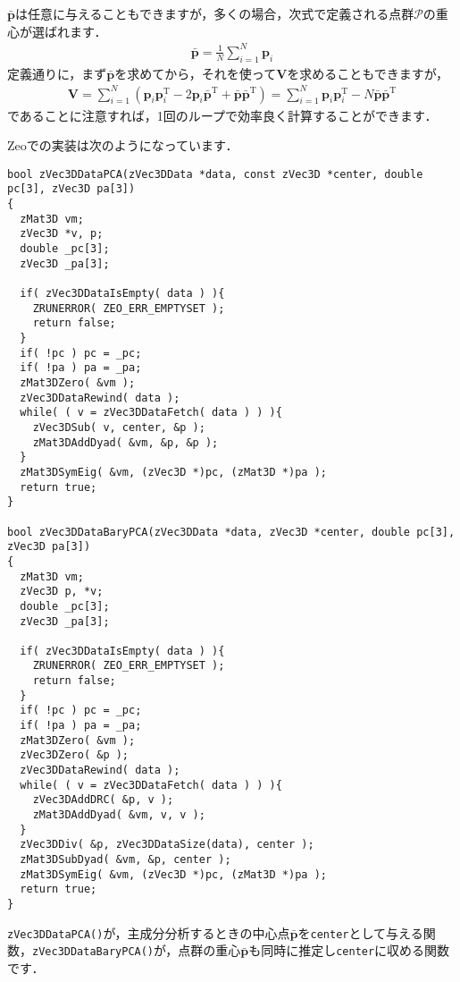 ﻿\documentclass[a4paper]{jsarticle}
\begin{document}
$\bar{\boldsymbol{p}}$は任意に与えることもできますが，多くの場合，次式で定義される点群$\mathcal{P}$の重心が選ばれます．
\begin{align*}
\bar{\boldsymbol{p}}=\frac{1}{N}\sum_{i=1}^{N}\boldsymbol{p}_{i}
\end{align*}
定義通りに，まず$\bar{\boldsymbol{p}}$を求めてから，それを使って$\boldsymbol{V}$を求めることもできますが，
\begin{align*}
\boldsymbol{V}
=\sum_{i=1}^{N}\left(\boldsymbol{p}_{i}\boldsymbol{p}_{i}^{\mathrm{T}}-2\boldsymbol{p}_{i}\bar{\boldsymbol{p}}^{\mathrm{T}}+\bar{\boldsymbol{p}}\bar{\boldsymbol{p}}^{\mathrm{T}}\right)
=\sum_{i=1}^{N}\boldsymbol{p}_{i}\boldsymbol{p}_{i}^{\mathrm{T}}-N\bar{\boldsymbol{p}}\bar{\boldsymbol{p}}^{\mathrm{T}}
\end{align*}
であることに注意すれば，1回のループで効率良く計算することができます．

Zeoでの実装は次のようになっています．
\begin{screen}
\begin{verbatim}
bool zVec3DDataPCA(zVec3DData *data, const zVec3D *center, double pc[3], zVec3D pa[3])
{
  zMat3D vm;
  zVec3D *v, p;
  double _pc[3];
  zVec3D _pa[3];

  if( zVec3DDataIsEmpty( data ) ){
    ZRUNERROR( ZEO_ERR_EMPTYSET );
    return false;
  }
  if( !pc ) pc = _pc;
  if( !pa ) pa = _pa;
  zMat3DZero( &vm );
  zVec3DDataRewind( data );
  while( ( v = zVec3DDataFetch( data ) ) ){
    zVec3DSub( v, center, &p );
    zMat3DAddDyad( &vm, &p, &p );
  }
  zMat3DSymEig( &vm, (zVec3D *)pc, (zMat3D *)pa );
  return true;
}

bool zVec3DDataBaryPCA(zVec3DData *data, zVec3D *center, double pc[3], zVec3D pa[3])
{
  zMat3D vm;
  zVec3D p, *v;
  double _pc[3];
  zVec3D _pa[3];

  if( zVec3DDataIsEmpty( data ) ){
    ZRUNERROR( ZEO_ERR_EMPTYSET );
    return false;
  }
  if( !pc ) pc = _pc;
  if( !pa ) pa = _pa;
  zMat3DZero( &vm );
  zVec3DZero( &p );
  zVec3DDataRewind( data );
  while( ( v = zVec3DDataFetch( data ) ) ){
    zVec3DAddDRC( &p, v );
    zMat3DAddDyad( &vm, v, v );
  }
  zVec3DDiv( &p, zVec3DDataSize(data), center );
  zMat3DSubDyad( &vm, &p, center );
  zMat3DSymEig( &vm, (zVec3D *)pc, (zMat3D *)pa );
  return true;
}
\end{verbatim}
\end{screen}

\verb|zVec3DDataPCA()|が，主成分分析するときの中心点$\bar{\boldsymbol{p}}$を\verb|center|として与える関数，\verb|zVec3DDataBaryPCA()|が，点群の重心$\bar{\boldsymbol{p}}$も同時に推定し\verb|center|に収める関数です．
\end{document}
